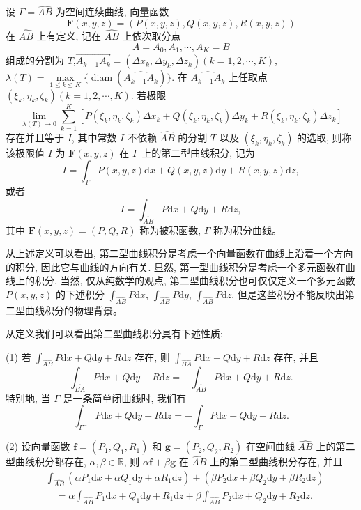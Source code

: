 \documentclass[UTF8,12pt,a4paper,fontset=fandol]{ctexart}
\begin{document}
\begin{definition}\label{course-definition-16-2-1}\quad 设 $\Gamma=\widehat{AB}$ 为空间连续曲线, 向量函数
\[
  \boldsymbol F(x,y,z)=(P(x,y,z),Q(x,y,z),R(x,y,z))
\]
在 $\widehat{AB}$ 上有定义, 记在 $\widehat{AB}$ 上依次取分点
\[
  A=A_0,A_1,\cdots,A_K=B
\]
组成的分割为 $T$,\allowbreak $\overrightarrow{A_{k-1}A_k}=(\Delta x_k,\Delta y_k,\Delta z_k)(k=1,2,\cdots,K)$, $\lambda(T)=\max\limits_{1\leqslant k\leqslant K}\{\operatorname{diam}(\widehat{A_{k-1}A_k})\}$. 在 $\widehat{A_{k-1}A_k}$ 上任取点 $(\xi_k,\eta_k,\zeta_k)(k=1,2,\cdots,K)$. 若极限
\[
  \lim_{\lambda(T)\to0}\sum_{k=1}^K
  [P(\xi_k,\eta_k,\zeta_k)\Delta x_k
  +Q(\xi_k,\eta_k,\zeta_k)\Delta y_k
  +R(\xi_k,\eta_k,\zeta_k)\Delta z_k]
\]
存在并且等于 $I$, 其中常数 $I$ 不依赖 $\widehat{AB}$ 的分割 $T$ 以及 $(\xi_k,\eta_k,\zeta_k)$ 的选取, 则称该极限值 $I$ 为 $\boldsymbol F(x,y,z)$ 在 $\Gamma$ 上的第二型曲线积分, 记为
\[
  I=\int_\Gamma P(x,y,z)\mathrm dx+Q(x,y,z)\mathrm dy+R(x,y,z)\mathrm dz,
\]
或者
\[
  I=\int_{\widehat{AB}}P\mathrm dx+Q\mathrm dy+R\mathrm dz,
\]
其中 $\boldsymbol F(x,y,z)=(P,Q,R)$ 称为被积函数, $\Gamma$ 称为积分曲线。

从上述定义可以看出, 第二型曲线积分是考虑一个向量函数在曲线上沿着一个方向的积分, 因此它与曲线的方向有关. 显然, 第一型曲线积分是考虑一个多元函数在曲线上的积分. 当然, 仅从纯数学的观点, 第二型曲线积分也可仅仅定义一个多元函数 $P(x,y,z)$ 的下述积分 $\int_{\widehat{AB}}P\mathrm dx$, $\int_{\widehat{AB}}P\mathrm dy$, $\int_{\widehat{AB}}P\mathrm dz$. 但是这些积分不能反映出第二型曲线积分的物理背景。

从定义我们可以看出第二型曲线积分具有下述性质:

(1) 若 $\int_{\widehat{AB}}P\mathrm dx+Q\mathrm dy+R\mathrm dz$ 存在, 则 $\int_{\widehat{BA}}P\mathrm dx+Q\mathrm dy+R\mathrm dz$ 存在, 并且
\[
  \int_{\widehat{BA}}P\mathrm dx+Q\mathrm dy+R\mathrm dz
  =-\int_{\widehat{AB}}P\mathrm dx+Q\mathrm dy+R\mathrm dz.
\]
特别地, 当 $\Gamma$ 是一条简单闭曲线时, 我们有
\[
  \int_{\Gamma^-}P\mathrm dx+Q\mathrm dy+R\mathrm dz
  =-\int_\Gamma P\mathrm dx+Q\mathrm dy+R\mathrm dz.
\]

(2) 设向量函数 $\boldsymbol f=(P_1,Q_1,R_1)$ 和 $\boldsymbol g=(P_2,Q_2,R_2)$ 在空间曲线 $\widehat{AB}$ 上的第二型曲线积分都存在, $\alpha,\beta\in\mathbb R$, 则 $\alpha\boldsymbol f+\beta\boldsymbol g$ 在 $\widehat{AB}$ 上的第二型曲线积分存在, 并且
\[
\begin{aligned}
  &\int_{\widehat{AB}}(\alpha P_1\mathrm dx+\alpha Q_1\mathrm dy+\alpha R_1\mathrm dz)
  +(\beta P_2\mathrm dx+\beta Q_2\mathrm dy+\beta R_2\mathrm dz)\\
  &\quad=\alpha\int_{\widehat{AB}}P_1\mathrm dx+Q_1\mathrm dy+R_1\mathrm dz
  +\beta\int_{\widehat{AB}}P_2\mathrm dx+Q_2\mathrm dy+R_2\mathrm dz.
\end{aligned}
\]


\end{definition}
\end{document}
